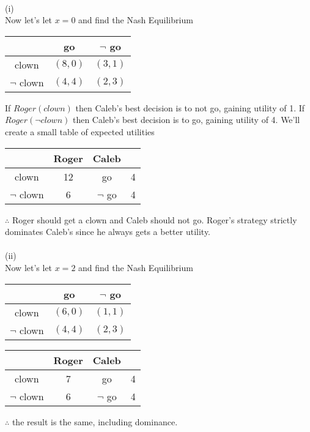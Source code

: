 \documentclass[12pt,letter]{article}
\begin{document}
\\
(i)\\
Now let's let $x=0$ and find the Nash Equilibrium
\begin{figure*}[h]
\centering
\begin{tabular}{|c|c|c|}
	\hline
	& go & $\neg$ go\\
	\hline
	clown & $(8,0)$ & $(3,1)$\\
	\hline
	$\neg$ clown & $(4,4)$ & $(2,3)$\\
	\hline
\end{tabular}
\end{figure*}
If $Roger(clown)$ then Caleb's best decision is to not go, gaining utility of 1.
If $Roger(\neg clown)$ then Caleb's best decision is to go, gaining utility of 4.
We'll create a small table of expected utilities
\begin{figure*}[h!]
\centering
\begin{tabular}{c c|c c}
	& Roger & Caleb\\
	\hline
	clown & 12 & go & 4\\
	$\neg$ clown & 6 & $\neg$ go & 4
\end{tabular}
\end{figure*}
\FloatBarrier
$\therefore$ Roger should get a clown and Caleb should not go. Roger's strategy
strictly dominates Caleb's since he always gets a better utility.
\\
\\
(ii)\\
Now let's let $x=2$ and find the Nash Equilibrium
\begin{figure*}[h!]
\centering
\begin{tabular}{|c|c|c|}
	\hline
	& go & $\neg$ go\\
	\hline
	clown & $(6,0)$ & $(1,1)$\\
	\hline
	$\neg$ clown & $(4,4)$ & $(2,3)$\\
	\hline
\end{tabular}
\end{figure*}
\begin{figure*}[h!]
\centering
\begin{tabular}{c c|c c}
	& Roger & Caleb\\
	\hline
	clown & 7 & go & 4\\
	$\neg$ clown & 6 & $\neg$ go & 4
\end{tabular}
\end{figure*}
\FloatBarrier
$\therefore$ the result is the same, including dominance.
\\
\\
\end{document}
